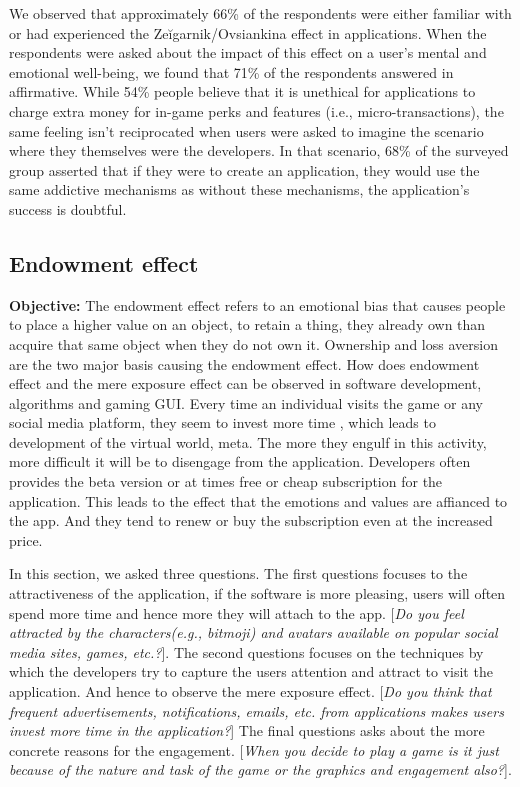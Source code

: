 \documentclass[conference]{IEEEtran}
\begin{document}
We observed that approximately 66\% of the respondents were either familiar with or had experienced the Zeĭgarnik/Ovsiankina effect in applications. When the respondents were asked about the impact of this effect on a user's mental and emotional well-being, we found that 71\% of the respondents answered in affirmative. While 54\% people believe that it is unethical for applications to charge extra money for in-game perks and features (i.e., micro-transactions), the same feeling isn't reciprocated when users were asked to imagine the scenario where they themselves were the developers. In that scenario, 68\% of the surveyed group asserted that if they were to create an application, they would use the same addictive mechanisms as without these mechanisms, the application's success is doubtful.

\subsection{Endowment effect}
\textbf{Objective:} The endowment effect refers to an emotional bias that causes people to place a higher value on an object, to retain a thing, they already own than acquire that same object when they do not own it. Ownership and loss aversion are the two major basis causing the endowment effect. How does endowment effect and the mere exposure effect can be observed in software development, algorithms and gaming GUI. Every time an individual visits the game or any social media platform, they seem to invest more time , which leads to development of the virtual world, meta. The more they engulf in this activity, more difficult it will be to disengage from the application. Developers often provides the beta version or at times free or cheap subscription for the application. This leads to the effect that the emotions and values are affianced to the app. And they tend to renew or buy the subscription even at the increased price.

In this section, we asked three questions. The first questions focuses to the attractiveness of the application, if the software is more pleasing, users will often spend more time and hence more they will attach to the app. [\textit{Do you feel attracted by the characters(e.g., bitmoji) and avatars available on popular social media sites, games, etc.?}]. The second questions focuses on the techniques by which the developers try to capture the users attention and attract to visit the application. And hence to observe the mere exposure effect. [\textit{Do you think that frequent advertisements, notifications, emails, etc. from applications makes users invest more time in the application?}] The final questions asks about the more concrete reasons for the engagement. [\textit{When you decide to play a game is it just because of the nature and task of the game or the graphics and engagement also?}].
\end{document}
